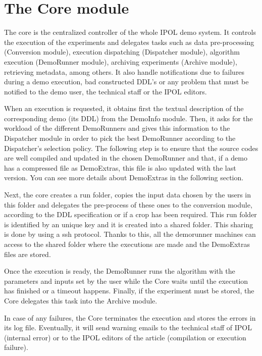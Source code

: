 \section{The Core module}
The core is the centralized controller of the whole IPOL demo system. It controls the execution of the experiments and delegates tasks such as data pre-processing (Conversion module), execution dispatching (Dispatcher module), algorithm execution (DemoRunner module), archiving experiments (Archive module), retrieving metadata, among others. It also handle notifications due to failures during a demo execution, bad constructed DDL's or any problem that must be notified to the demo user, the technical staff or the IPOL editors.

When an execution is requested, it obtains first the textual description of the corresponding demo (its DDL) from the DemoInfo module. Then, it asks for the workload of the different DemoRunners and gives this information to the Dispatcher module in order to pick the best DemoRunner according to the Dispatcher’s selection policy. The following step is to ensure that the source codes are well compiled and updated in the chosen DemoRunner and that, if a demo has a compressed file as DemoExtras, this file is also updated with the last version. You can see more details about DemoExtras in the following section.

Next, the core creates a run folder, copies the input data chosen by the users in this folder and delegates the pre-process of these ones to the conversion module, according to the DDL specification or if a crop has been required. This run folder is identified by an unique key and it is created into a shared folder. This sharing is done by using a ssh protocol. Thanks to this, all the demorunner machines can access to the shared folder where the executions are made and the DemoExtras files are stored. 

Once the execution is ready, the DemoRunner runs the algorithm with the parameters and inputs set by the user while the Core waits until the execution has finished or a timeout happens. Finally, if the experiment must be stored, the Core delegates this task into the Archive module.

In case of any failures, the Core terminates the execution and stores the errors in its log file. Eventually, it will send warning emails to the technical staff of IPOL (internal error) or to the IPOL editors of the article (compilation or execution failure).
% 

